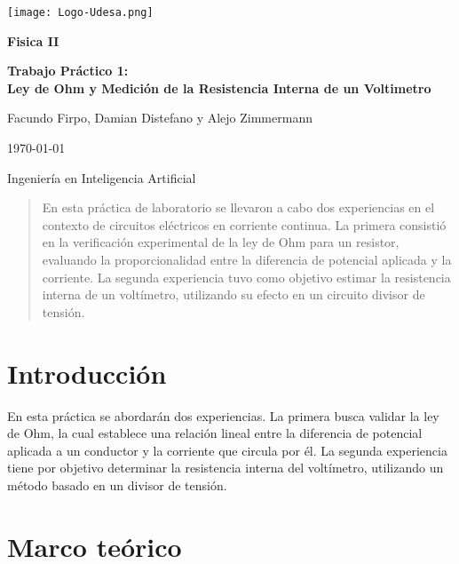 \documentclass[11pt]{article}
\begin{document}
\begin{titlepage}
    \centering
    \vspace*{0.5cm}
    \texttt{[image: Logo-Udesa.png]}\par
    \vspace{10pt}

    {\LARGE \textbf{Fisica II}\par}
    \vspace{1cm}

    {\LARGE \textbf{Trabajo Práctico 1: \\Ley de Ohm y Medición de la Resistencia Interna de un Voltimetro}\par}
    \vspace{2cm}
    
    {\LARGE {Facundo Firpo, Damian  Distefano y Alejo Zimmermann}\par}
    \vspace{4cm}
    
    {\Large \today\par}
    \vspace{1cm}
    \Large{Ingeniería en Inteligencia Artificial}
\end{titlepage}


\begin{abstract}
En esta práctica de laboratorio se llevaron a cabo dos experiencias en el contexto de circuitos eléctricos en corriente continua. La primera consistió en la verificación experimental de la ley de Ohm para un resistor, evaluando la proporcionalidad entre la diferencia de potencial aplicada y la corriente. La segunda experiencia tuvo como objetivo estimar la resistencia interna de un voltímetro, utilizando su efecto en un circuito divisor de tensión.
\end{abstract}

\section*{Introducción}

En esta práctica se abordarán dos experiencias. La primera busca validar la ley de Ohm, la cual establece una relación lineal entre la diferencia de potencial aplicada a un conductor y la corriente que circula por él. La segunda experiencia tiene por objetivo determinar la resistencia interna del voltímetro, utilizando un método basado en un divisor de tensión.

\section*{Marco teórico}
\end{document}
